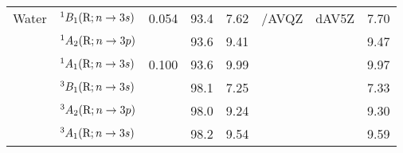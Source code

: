 \begin{tabular}{llcccccc}
      Water		& $^1B_1 (\mathrm{R}; n \rightarrow 3s)$ 						& 0.054	&93.4 &7.62		& {\exCI}/AVQZ&dAV5Z 		&7.70	 \\
                        & $^1A_2 (\mathrm{R}; n \rightarrow 3p)$ 						& 		&93.6 &9.41		&			&			&9.47 	 \\	
                        & $^1A_1 (\mathrm{R}; n \rightarrow 3s)$ 						& 0.100	&93.6 &9.99		&			&			&9.97	 \\	
                        & $^3B_1 (\mathrm{R}; n \rightarrow 3s)$ 						& 		&98.1 &7.25		&			&			&7.33	 \\	
                        & $^3A_2 (\mathrm{R}; n \rightarrow 3p)$ 						& 		&98.0 &9.24 		&			&			&9.30	 \\	
                        & $^3A_1 (\mathrm{R}; n \rightarrow 3s)$ 						& 		&98.2 &9.54		&			&			&9.59	 \\	
       \end{tabular}